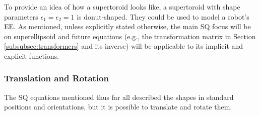 To provide an idea of how a supertoroid looks like, a supertoroid with shape parameters $\epsilon_1 = \epsilon_2 = 1$ is donut-shaped. They could be used to model a robot's \gls{EE}. As mentioned, unless explicitly stated otherwise, the main \gls{SQ} focus will be on superellipsoid and future equations (e.g., the transformation matrix in Section \ref{subsubsec:transformers} and its inverse) will be applicable to its implicit and explicit functions.
\subsubsection*{Translation and Rotation} \label{subsubsec:transformers}

The \gls{SQ} equations mentioned thus far all described the shapes in standard positions and orientations, but it is possible to translate and rotate them. 


